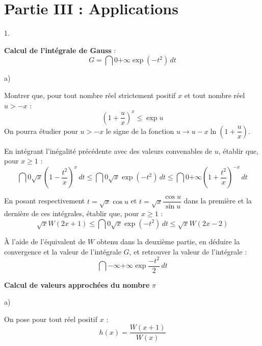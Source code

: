 \documentclass[11pt]{article}%
\begin{document}
\section*{Partie III : Applications}

\renewcommand\theenumi{\Alph{enumi}}
\renewcommand\theenumii{\arabic{enumii}}
\renewcommand\theenumiii{\alph{enumiii}}
\renewcommand\labelenumii{\theenumii)}%

\begin{noliste}{1.}
 \setlength{\itemsep}{4mm}
\item \textbf{Calcul de l'intégrale de Gauss} : 
\[
G = \dint{0}{+ \infty }\exp (-t^{2})\,dt
\]

\begin{noliste}{a)}
 \setlength{\itemsep}{2mm}
\item Montrer que, pour tout nombre réel strictement positif $x$ et
tout
nombre réel $u>-x$ : 
\[
\left( 1 + \dfrac{u}{x}\right) ^{x}\leq \exp u
\]
On pourra étudier pour $u>-x$ le signe de la fonction $u\rightarrow
u-x\ln
(1 + \dfrac{u}{x})$.

\item En intégrant l'inégalité précédente avec des valeurs convenables
de $u$, établir que, pour $x\geq 1$ : 
\[
\dint{0}{\sqrt{x}}\left( 1-\dfrac{t^{2}}{x}\right) ^{x}\,dt\leq
\dint{0}{\sqrt{x}}\exp (-t^{2})\,dt\leq
\dint{0}{+ \infty }\left( 1 + \dfrac{t^{2}}{x}\right) ^{-x}\,dt
\]

\item En posant respectivement $t = \sqrt{x}\cos u$ et $t =
\sqrt{x}\dfrac{\cos u}{\sin u}$ dans la première et la dernière de ces
intégrales, établir que,
pour $x\geq 1$ : 
\[
\sqrt{x}W(2x + 1)\leq \dint{0}{\sqrt{x}}\exp
(-t^{2})\,dt\leq \sqrt{x}W(2x-2)
\]

\item À l'aide de l'équivalent de $W$ obtenu dans la deuxième partie,
en déduire la convergence et la valeur de l'intégrale $G$, et retrouver
la valeur
de l'intégrale : 
\[
\dint{-\infty }{+ \infty }\exp \dfrac{-t^{2}}{2}\,dt
\]
\end{noliste}

\item \textbf{Calcul de valeurs approchées du nombre} $\pi $

\begin{noliste}{a)}
 \setlength{\itemsep}{2mm}
\item On pose pour tout réel positif $x$ : 
\[
h(x) = \dfrac{W(x + 1)}{W(x)}
\]


\end{noliste}
\end{noliste}
\end{document}
